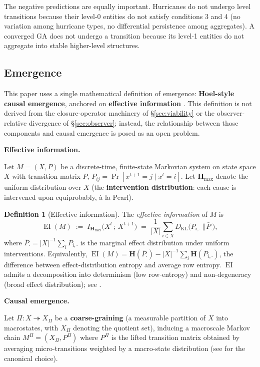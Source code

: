 \documentclass[journal]{IEEEtran}
\theoremstyle{plain}
\theoremstyle{definition}
\newtheorem{definition}[theorem]{Definition}
\theoremstyle{plain}
\newcounter{topic}[subsection]
\newcommand{\topic}[1]{%
  \refstepcounter{topic}%
  \par\smallskip\noindent\textbf{#1.}\ }
\DeclareMathOperator{\EI}{EI}
\DeclareMathOperator{\KL}{KL}
\newcommand{\Hmax}{\mathbf{H}_{\max}}
\begin{document}
The negative predictions are equally important. Hurricanes do not
undergo level transitions because their level-0 entities do not
satisfy conditions 3 and 4 (no variation among hurricane types, no
differential persistence among aggregates). A converged GA does not
undergo a transition because its level-1 entities do not aggregate
into stable higher-level structures.

\subsection{Emergence}\label{sec:emergence}

This paper uses a single mathematical definition of emergence:
\textbf{Hoel-style causal emergence}, anchored on \textbf{effective
information} \cite{hoel2013macro,hoel2017map,klein2020scales,comolatti2022causal}.
This definition is not derived from the
closure-operator machinery of \S\ref{sec:viability} or the observer-relative
divergence of \S\ref{sec:observer};
instead, the relationship between those components and causal emergence is
posed as an open problem.

\topic{Effective information}

Let $M = (X,P)$ be a discrete-time, finite-state Markovian system on state
space $X$ with transition matrix $P$,
$P_{ij} = \Pr[x^{t+1}=j \mid x^t=i]$. Let $\Hmax$ denote the uniform
distribution over $X$ (the \textbf{intervention distribution}: each cause is
intervened upon equiprobably, \`a la Pearl).

\begin{definition}[Effective information]
The \emph{effective information} of $M$ is
\[
  \EI(M) \;:=\; I_{\Hmax}\!\big(X^t \,;\, X^{t+1}\big)
  \;=\; \frac{1}{|X|}\sum_{i\in X}
        D_{\KL}\!\big(P_{i,\cdot} \,\big\Vert\, \bar P_{\cdot}\big),
\]
where $\bar P_\cdot = |X|^{-1}\sum_i P_{i,\cdot}$ is the marginal effect
distribution under uniform interventions. Equivalently,
$\EI(M)= \mathbf{H}(\bar P_\cdot) - |X|^{-1}\sum_i \mathbf{H}(P_{i,\cdot})$,
the difference between effect-distribution entropy and average row entropy.
$\EI$ admits a decomposition into determinism (low row-entropy) and
non-degeneracy (broad effect distribution); see \cite{hoel2013macro}.
\end{definition}

\topic{Causal emergence}

Let $\Pi : X \twoheadrightarrow X_{\Pi}$ be a \textbf{coarse-graining} (a
measurable partition of $X$ into macrostates, with $X_{\Pi}$ denoting the
quotient set), inducing a macroscale Markov chain
$M^{\Pi} = (X_{\Pi}, P^{\Pi})$ where $P^{\Pi}$ is the lifted transition
matrix obtained by averaging micro-transitions weighted by a macro-state
distribution (see \cite{klein2020scales} for the canonical choice).
\end{document}
